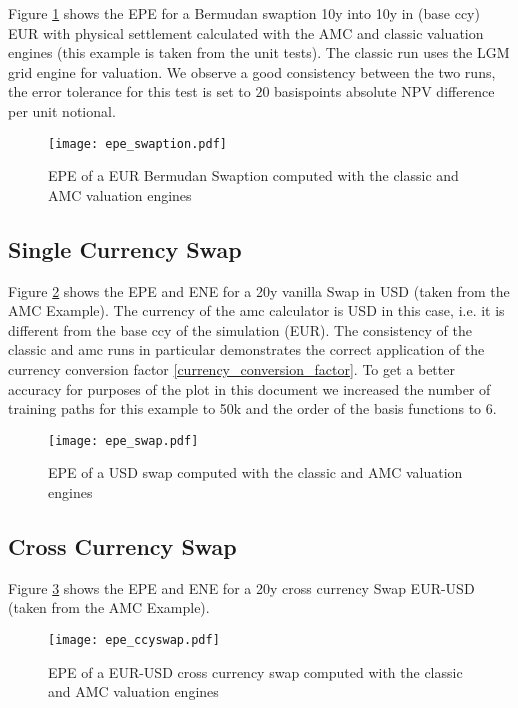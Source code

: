 \documentclass[12pt, a4paper]{article}
\begin{document}
Figure \ref{epe_swaption} shows the EPE for a Bermudan swaption 10y into 10y in (base ccy) EUR with physical settlement
calculated with the AMC and classic valuation engines (this example is taken from the unit tests). The classic run uses
the LGM grid engine for valuation. We observe a good consistency between the two runs, the error tolerance for this test
is set to $20$ basispoints absolute NPV difference per unit notional.

\begin{figure}
  \texttt{[image: epe\_swaption.pdf]}
  \caption{EPE of a EUR Bermudan Swaption computed with the classic and AMC valuation engines}
  \label{epe_swaption}
\end{figure}

\subsection{Single Currency Swap}

Figure \ref{epe_swap} shows the EPE and ENE for a 20y vanilla Swap in USD (taken from the AMC Example). The currency of
the amc calculator is USD in this case, i.e. it is different from the base ccy of the simulation (EUR). The consistency
of the classic and amc runs in particular demonstrates the correct application of the currency conversion factor
\ref{currency_conversion_factor}. To get a better accuracy for purposes of the plot in this document we increased the
number of training paths for this example to 50k and the order of the basis functions to 6.

\begin{figure}
  \texttt{[image: epe\_swap.pdf]}
  \caption{EPE of a USD swap computed with the classic and AMC valuation engines}
  \label{epe_swap}
\end{figure}

\subsection{Cross Currency Swap}

Figure \ref{epe_ccyswap} shows the EPE and ENE for a 20y cross currency Swap EUR-USD (taken from the AMC Example). 

\begin{figure}
  \texttt{[image: epe\_ccyswap.pdf]}
  \caption{EPE of a EUR-USD cross currency swap computed with the classic and AMC valuation engines}
  \label{epe_ccyswap}
\end{figure}
\end{document}
